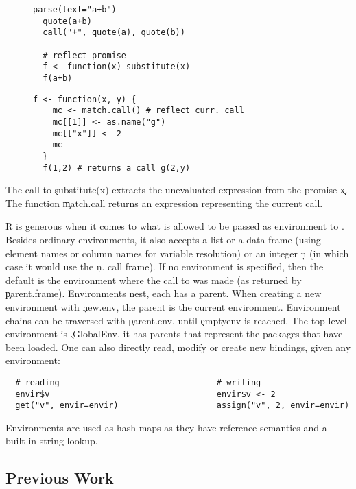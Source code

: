 \documentclass[screen,acmsmall]{acmart}%
\begin{document}
\begin{figure}[htb]
\begin{minipage}{.49\textwidth}
\begin{lstlisting}[caption={Examples of calls producing expression \c{a+b}}]
  parse(text="a+b")
  quote(a+b)
  call("+", quote(a), quote(b))

  # reflect promise
  f <- function(x) substitute(x)
  f(a+b)
  \end{lstlisting}
\end{minipage}
\begin{minipage}{.49\textwidth}
  \begin{lstlisting}[caption={Example of a call reflection}]
  f <- function(x, y) {
    mc <- match.call() # reflect curr. call
    mc[[1]] <- as.name("g")
    mc[["x"]] <- 2
    mc
  }
  f(1,2) # returns a call g(2,y)
  \end{lstlisting}
\end{minipage}
\end{figure}

 The call to \c{substitute(x)} extracts the unevaluated expression from
the promise \c{x}. The function \c{match.call} returns an expression
representing the current call.

R is generous when it comes to what is allowed to be passed as environment to
\eval. Besides ordinary environments, it also accepts a list or a data
frame (using element names or column names for variable resolution) or an
integer \c{n} (in which case it would use the \c{n.} call frame). If no
environment is specified, then the default is the environment where the call to
\eval was made (as returned by \c{parent.frame}).
%
Environments nest, each has a parent. When creating a new environment with
\c{new.env}, the parent is the current environment. Environment chains can be
traversed with \c{parent.env}, until \c{emptyenv} is reached. The top-level
environment is \c{.GlobalEnv}, it has parents that represent the packages that
have been loaded. One can also directly read, modify or create new bindings,
given any environment:
%
\begin{lstlisting}
  # reading                                # writing
  envir$v                                  envir$v <- 2
  get("v", envir=envir)                    assign("v", 2, envir=envir)
\end{lstlisting}
%
 Environments are used as hash maps as they have reference semantics
and a built-in string lookup.

\subsection{Previous Work}
\end{document}
